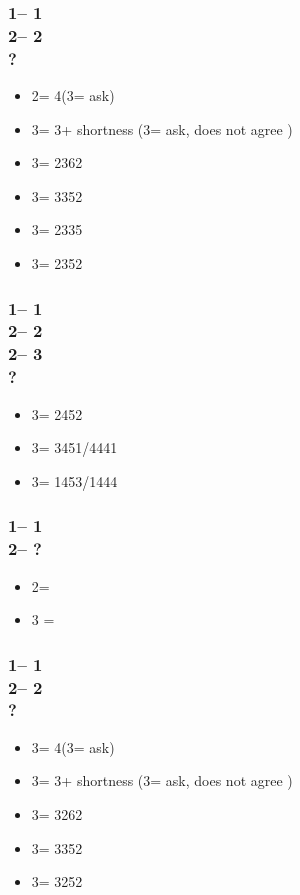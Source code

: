 \documentclass[12pt, a4paper]{article}
\begin{document}
\subsubsection*{1\diams -- 1\hearts\\
                2\hearts -- 2\spades\\
                ?}
\begin{itemize}
    \item 2\nt = 4\hearts (3\clubs = ask)
    \item 3\clubs = 3\hearts + shortness (3\diams = ask, does not agree \hearts)
    \item 3\diams = 2362
    \item 3\hearts = 3352
    \item 3\spades = 2335
    \item 3\nt = 2352
\end{itemize}

\subsubsection*{1\diams -- 1\hearts\\
                2\hearts -- 2\spades\\
                2\nt -- 3\clubs\\
                ?}
\begin{itemize}
    \item 3\diams = 2452
    \item 3\hearts = 3451/4441
    \item 3\spades = 1453/1444
\end{itemize}

\subsubsection*{1\diams -- 1\spades\\
                2\spades -- ?}
\begin{itemize}
    \item 2\nt = \gf
    \item 3 = \inv
\end{itemize}

\subsubsection*{1\diams -- 1\spades\\
                2\spades -- 2\nt\\
                ?}
\begin{itemize}
    \item 3\clubs = 4\spades (3\diams = ask)
    \item 3\diams = 3\spades + shortness (3\hearts = ask, does not agree \spades)
    \item 3\hearts = 3262
    \item 3\spades = 3352
    \item 3\nt = 3252
\end{itemize}
\end{document}
